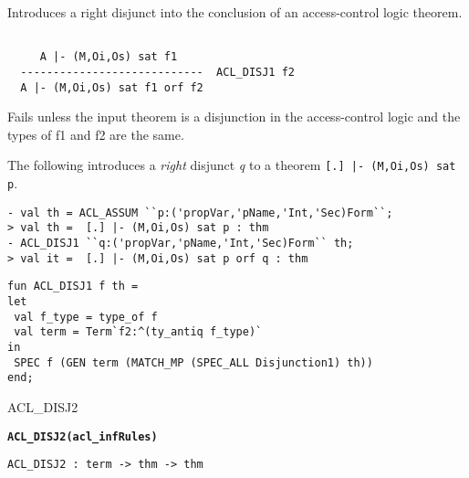 \SYNOPSIS
Introduces a right disjunct into the conclusion of an access-control
logic theorem.

\DESCRIBE
\begin{verbatim}

     A |- (M,Oi,Os) sat f1
  ----------------------------  ACL_DISJ1 f2
  A |- (M,Oi,Os) sat f1 orf f2
\end{verbatim}

\FAILURE
Fails unless the input theorem is a disjunction in the
access-control logic and the types of f1 and f2 are the same.

\EXAMPLE 
The following introduces a \emph{right} disjunct \emph{q} to
a theorem \texttt{[.] |- (M,Oi,Os) sat p}.
\begin{holboxed}
\begin{verbatim}
- val th = ACL_ASSUM ``p:('propVar,'pName,'Int,'Sec)Form``;
> val th =  [.] |- (M,Oi,Os) sat p : thm
- ACL_DISJ1 ``q:('propVar,'pName,'Int,'Sec)Form`` th;
> val it =  [.] |- (M,Oi,Os) sat p orf q : thm
\end{verbatim}
\end{holboxed}

\IMPLEMENTATION
\begin{holboxed}
\begin{verbatim}
fun ACL_DISJ1 f th = 
let
 val f_type = type_of f
 val term = Term`f2:^(ty_antiq f_type)`
in
 SPEC f (GEN term (MATCH_MP (SPEC_ALL Disjunction1) th))
end;
\end{verbatim}
\end{holboxed}

\SEEALSO
ACL\_DISJ2
\ENDDOC
  

\begin{holboxed}
  \begin{Large}
    \textbf{\texttt{ACL\_DISJ2}}\hfill{}\textbf{\texttt{(acl\_infRules)}}
  \end{Large}
\end{holboxed}
\begin{verbatim}
ACL_DISJ2 : term -> thm -> thm
\end{verbatim}

